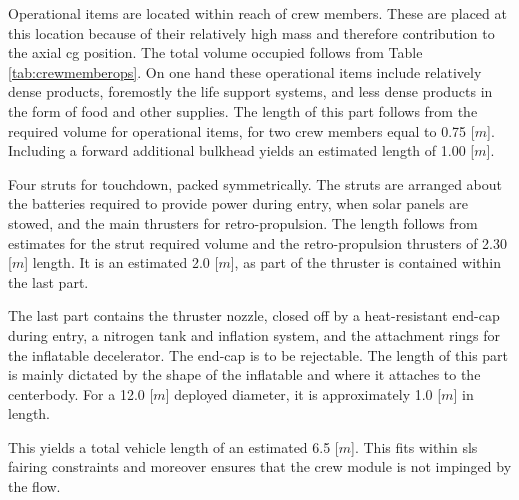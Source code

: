 Operational items are located within reach of crew members. These are placed at this location because of their relatively high mass and therefore contribution to the axial \gls{cg} position. The total volume occupied follows from Table \ref{tab:crewmemberops}. On one hand these operational items include relatively dense products, foremostly the life support systems, and less dense products in the form of food and other supplies.  The length of this part follows from the required volume for operational items, for two crew members equal to 0.75 [$m$]. Including a forward additional bulkhead yields an estimated length of 1.00 [$m$].


Four struts for touchdown, packed symmetrically. The struts are arranged about the batteries required to provide power during entry, when solar panels are stowed, and the main thrusters for retro-propulsion. The length follows from estimates for the strut required volume and the retro-propulsion thrusters of 2.30 [$m$] length. It is an estimated 2.0 [$m$], as part of the thruster is contained within the last part.

The last part contains the thruster nozzle, closed off by a heat-resistant end-cap during entry, a nitrogen tank and inflation system, and the attachment rings for the inflatable decelerator. The end-cap is to be rejectable. The length of this part is mainly dictated by the shape of the inflatable and where it attaches to the centerbody. For a 12.0 [$m$] deployed diameter, it is approximately 1.0 [$m$] in length.

This yields a total vehicle length of an estimated 6.5 [$m$]. This fits within \gls{sls} fairing constraints  and moreover ensures that the crew module is not impinged by the flow.

